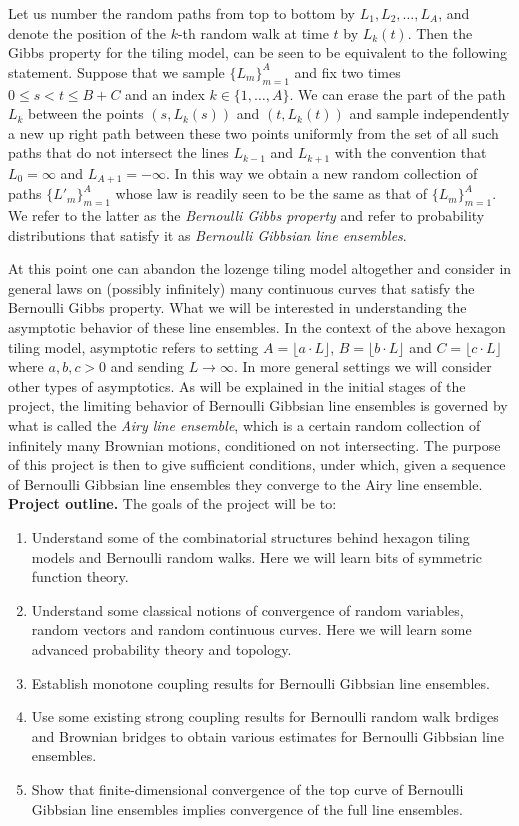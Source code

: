 \documentclass[a4paper, 11pt]{amsart}
\newcounter{theo}[section]\setcounter{theo}{0}
\begin{document}
Let us number the random paths from top to bottom by $L_1, L_2, \dots, L_A$, and denote the position of the $k$-th random walk at time $t$ by $L_k(t)$. Then the Gibbs property for the tiling model, can be seen to be equivalent to the following statement. Suppose that we sample $\{L_m\}_{m = 1}^A$ and fix two times $0 \leq s < t \leq B+C$ and an index $k \in \{1, \dots, A\}$. We can erase the part of the path $L_k$ between the points $(s, L_k(s))$ and $(t, L_k(t))$ and sample independently a new up right path between these two points uniformly from the set of all such paths that do not intersect the lines $L_{k-1}$ and $L_{k + 1}$ with the convention that $L_{0} = \infty$ and $L_{A+1} = -\infty$. In this way we obtain a new random collection of paths $\{L'_m\}_{m = 1}^A$ whose law is readily seen to be the same as that of $\{L_m\}_{m = 1}^A$. We refer to the latter as the {\em Bernoulli Gibbs property} and refer to probability distributions that satisfy it as {\em Bernoulli Gibbsian line ensembles}. 

At this point one can abandon the lozenge tiling model altogether and consider in general laws on (possibly infinitely) many continuous curves that satisfy the Bernoulli Gibbs property. What we will be interested in understanding the asymptotic behavior of these line ensembles. In the context of the above hexagon tiling model, asymptotic refers to setting $A = \lfloor a \cdot L \rfloor$, $B = \lfloor b \cdot L \rfloor $ and $C = \lfloor c \cdot L \rfloor $ where $a,b,c > 0$ and sending $L \rightarrow \infty$. In more general settings we will consider other types of asymptotics. As will be explained in the initial stages of the project, the limiting behavior of  {Bernoulli Gibbsian line ensembles} is governed by what is called the {\em Airy line ensemble}, which is a certain random collection of infinitely many Brownian motions, conditioned on not intersecting. The purpose of this project is then to give sufficient conditions, under which, given a sequence of Bernoulli Gibbsian line ensembles they converge to the Airy line ensemble.\\

{\raggedleft \bf Project outline.} The goals of the project will be to:
\begin{enumerate}
\item Understand some of the combinatorial structures behind hexagon tiling models and Bernoulli random walks. Here we will learn bits of symmetric function theory.
\item Understand some classical notions of convergence of random variables, random vectors and random continuous curves. Here we will learn some advanced probability theory and topology.
\item Establish monotone coupling results for Bernoulli Gibbsian line ensembles.
\item Use some existing strong coupling results for Bernoulli random walk brdiges and Brownian bridges to obtain various estimates for Bernoulli Gibbsian line ensembles.
\item Show that finite-dimensional convergence of the top curve of Bernoulli Gibbsian line ensembles implies convergence of the full line ensembles.
\end{enumerate}
\end{document}
